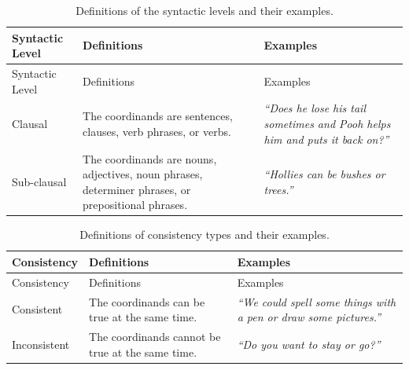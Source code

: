 \documentclass[
  english,
  ,man,floatsintext]{apa6}
\begin{document}
\begin{longtable}[]{@{}
  >{\raggedright\arraybackslash}p{}
  >{\raggedright\arraybackslash}p{}
  >{\raggedright\arraybackslash}p{}@{}}
\caption{\label{tab:syntacticLevel} Definitions of the syntactic levels and their examples.}\tabularnewline
\toprule
Syntactic Level & Definitions & Examples \\
\midrule
\endfirsthead
\toprule
Syntactic Level & Definitions & Examples \\
\midrule
\endhead
Clausal & The coordinands are sentences, clauses, verb phrases, or verbs. & \emph{``Does he lose his tail sometimes and Pooh helps him and puts it back on?''} \\
Sub-clausal & The coordinands are nouns, adjectives, noun phrases, determiner phrases, or prepositional phrases. & \emph{``Hollies can be bushes or trees.''} \\
\bottomrule
\end{longtable}

\begin{longtable}[]{@{}
  >{\raggedright\arraybackslash}p{}
  >{\raggedright\arraybackslash}p{}
  >{\raggedright\arraybackslash}p{}@{}}
\caption{\label{tab:consistencyType} Definitions of consistency types and their examples.}\tabularnewline
\toprule
Consistency & Definitions & Examples \\
\midrule
\endfirsthead
\toprule
Consistency & Definitions & Examples \\
\midrule
\endhead
Consistent & The coordinands can be true at the same time. & \emph{``We could spell some things with a pen or draw some pictures.''} \\
Inconsistent & The coordinands cannot be true at the same time. & \emph{``Do you want to stay or go?''} \\
\bottomrule
\end{longtable}
\end{document}
